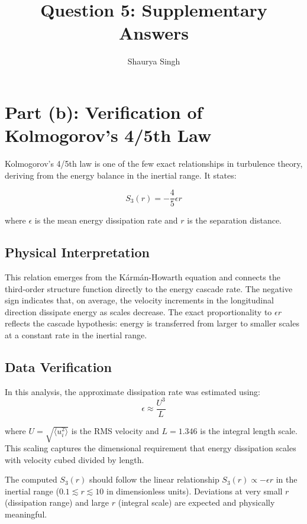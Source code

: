 \documentclass[12pt]{article}
\title{Question 5: Supplementary Answers}
\author{Shaurya Singh}
\date{}
\begin{document}
\maketitle

\section*{Part (b): Verification of Kolmogorov's 4/5th Law}

Kolmogorov's 4/5th law is one of the few exact relationships in turbulence theory, deriving from the energy balance in the inertial range. It states:

\begin{equation}
S_3(r) = -\frac{4}{5}\epsilon r
\end{equation}

where $\epsilon$ is the mean energy dissipation rate and $r$ is the separation distance.

\subsection*{Physical Interpretation}

This relation emerges from the Kármán-Howarth equation and connects the third-order structure function directly to the energy cascade rate. The negative sign indicates that, on average, the velocity increments in the longitudinal direction dissipate energy as scales decrease. The exact proportionality to $\epsilon r$ reflects the cascade hypothesis: energy is transferred from larger to smaller scales at a constant rate in the inertial range.

\subsection*{Data Verification}

In this analysis, the approximate dissipation rate was estimated using:
\begin{equation}
\epsilon \approx \frac{U^3}{L}
\end{equation}

where $U = \sqrt{\langle u_i^2 \rangle}$ is the RMS velocity and $L = 1.346$ is the integral length scale. This scaling captures the dimensional requirement that energy dissipation scales with velocity cubed divided by length.

The computed $S_3(r)$ should follow the linear relationship $S_3(r) \propto -\epsilon r$ in the inertial range ($0.1 \lesssim r \lesssim 10$ in dimensionless units). Deviations at very small $r$ (dissipation range) and large $r$ (integral scale) are expected and physically meaningful.
\end{document}
